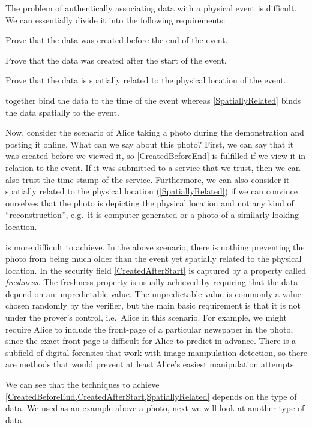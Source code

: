 The problem of authentically associating data with a physical event is 
difficult.
We can essentially divide it into the following requirements:
\begin{requirements}
  \item\label{CreatedBeforeEnd} Prove that the data was created before the end 
    of the event.
  \item\label{CreatedAfterStart} Prove that the data was created after the 
    start of the event.
  \item\label{SpatiallyRelated} Prove that the data is spatially related to 
    the physical location of the event.
\end{requirements}
 together bind the data to the time of 
the event whereas \cref{SpatiallyRelated} binds the data spatially to the 
event.

Now, consider the scenario of Alice taking a photo during the demonstration and 
posting it online.
What can we say about this photo?
First, we can say that it was created before we viewed it, so 
\cref{CreatedBeforeEnd} is fulfilled if we view it in relation to the event.
If it was submitted to a service that we trust, then we can also trust the 
time-stamp of the service.
Furthermore, we can also consider it spatially related to the physical location
(\cref{SpatiallyRelated}) if we can convince ourselves that the photo is 
depicting the physical location and not any kind of \enquote{reconstruction}, 
e.g.\ it is computer generated or a photo of a similarly looking location.

 is more difficult to achieve.
In the above scenario, there is nothing preventing the photo from being much 
older than the event yet spatially related to the physical location.
In the security field \cref{CreatedAfterStart} is captured by a property called 
\emph{freshness}.
The freshness property is usually achieved by requiring that the data depend on
an unpredictable value.
The unpredictable value is commonly a value chosen randomly by the verifier, 
but the main basic requirement is that it is not under the prover's control, 
i.e.\ Alice in this scenario.
For example, we might require Alice to include the front-page of a particular 
newspaper in the photo, since the exact front-page is difficult for Alice to 
predict in advance.
There is a subfield of digital forensics that work with image manipulation 
detection, so there are methods that would prevent at least Alice's easiest 
manipulation attempts.

We can see that the techniques to achieve 
\cref{CreatedBeforeEnd,CreatedAfterStart,SpatiallyRelated} depends on the type 
of data.
We used as an example above a photo, next we will look at another type of data.
